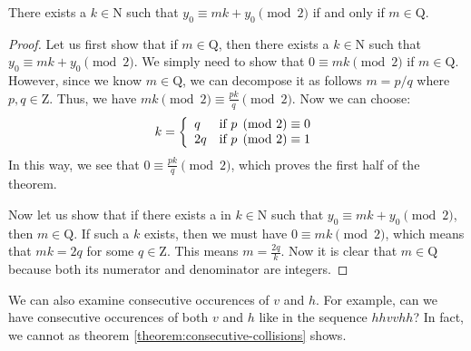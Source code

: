 \begin{theorem}
  \label{theorem:periodicity}
  There exists a $k \in \mathrm{N}$ such that $y_0 \equiv mk + y_0 \pmod{2}$ if and only if $m \in \mathrm{Q}$.
\end{theorem}
\begin{proof}
  Let us first show that if $m \in \mathrm{Q}$, then there exists a $k \in \mathrm{N}$ such that $y_0 \equiv mk + y_0 \pmod{2}$. We simply need to show that $0 \equiv mk \pmod{2}$ if $m \in \mathrm{Q}$. However, since we know $m \in \mathrm{Q}$, we can decompose it as follows $m = p/q$ where $p,q \in \mathrm{Z}$. Thus, we have $mk \pmod{2} \equiv \frac{pk}{q} \pmod{2}$. Now we can choose:
  \begin{eqnarray}
    k = \left\{\begin{array}{l c}
      q & \textrm{if } p \pmod{2} \equiv 0 \\
      2q & \textrm{if } p \pmod{2} \equiv 1
    \end{array}\right.
  \end{eqnarray}
  In this way, we see that $0 \equiv \frac{pk}{q} \pmod{2}$, which proves the first half of the theorem.

  Now let us show that if there exists a in $k \in \mathrm{N}$ such that $y_0 \equiv mk + y_0 \pmod{2}$, then $m \in \mathrm{Q}$. If such a $k$ exists, then we must have $0 \equiv mk \pmod{2}$, which means that $mk = 2q$ for some $q \in \mathrm{Z}$. This means $m = \frac{2q}{k}$. Now it is clear that $m \in \mathrm{Q}$ because both its numerator and denominator are integers.
\end{proof}

We can also examine consecutive occurences of $v$ and $h$. For example, can we have consecutive occurences of both $v$ and $h$ like in the sequence $hhvvhh$? In fact, we cannot as theorem \ref{theorem:consecutive-collisions} shows.

